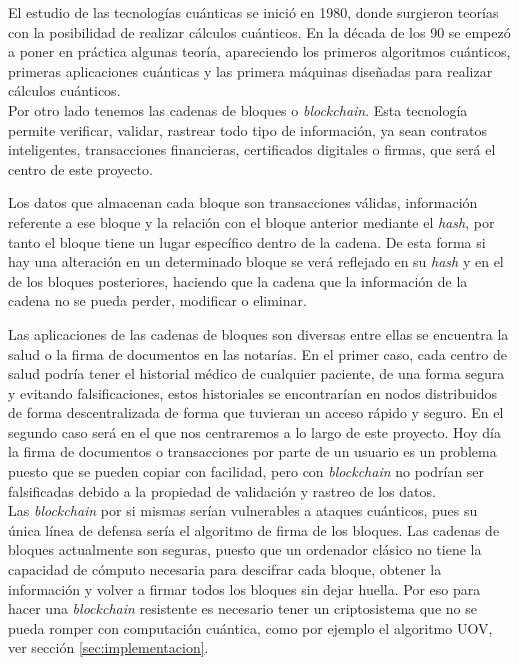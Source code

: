 \begin{itemize}
El estudio de las tecnologías cuánticas se inició en 1980, donde surgieron teorías con la posibilidad de realizar cálculos cuánticos. En la década de los 90 se empezó a poner en práctica algunas teoría, apareciendo los primeros algoritmos cuánticos, primeras aplicaciones cuánticas y las primera máquinas diseñadas para realizar cálculos cuánticos.\\



Por otro lado tenemos las cadenas de bloques o \textit{blockchain}. Esta tecnología permite verificar, validar, rastrear todo tipo de información, ya sean contratos inteligentes, transacciones financieras, certificados digitales o firmas, que será el centro de este proyecto.

Los datos que almacenan cada bloque son transacciones válidas, información referente a ese bloque y la relación con el bloque anterior mediante el \textit{hash}, por tanto el bloque tiene un lugar específico dentro de la cadena. De esta forma si hay una alteración en un determinado bloque se verá reflejado en su \textit{hash} y en el de los bloques posteriores, haciendo que la cadena que la información de la cadena no se pueda perder, modificar o eliminar. 

Las aplicaciones de las cadenas de bloques son diversas entre ellas se encuentra la salud o la firma de documentos en las notarías. En el primer caso, cada centro  de salud podría tener el historial médico de cualquier paciente, de una forma segura y evitando falsificaciones, estos historiales se encontrarían en nodos distribuidos de forma descentralizada de forma que tuvieran un acceso rápido y seguro. En el segundo caso será en el que nos centraremos a lo largo de este proyecto. Hoy día la firma de documentos o transacciones por parte de un usuario es un problema puesto que se pueden copiar con facilidad, pero con \textit{blockchain} no podrían ser falsificadas debido a la propiedad de validación y rastreo de los datos.\\

Las \textit{blockchain} por si mismas serían vulnerables a ataques cuánticos, pues su única línea de defensa sería el algoritmo de firma de los bloques. Las cadenas de bloques actualmente son seguras, puesto que un ordenador clásico no tiene la capacidad de cómputo necesaria para descifrar cada bloque, obtener la información y volver a firmar todos los bloques sin dejar huella. Por eso para hacer una \textit{blockchain} resistente es necesario tener un criptosistema que no se pueda romper con computación cuántica, como por ejemplo el algoritmo UOV, ver sección \ref{sec:implementacion}. 

\end{itemize}


